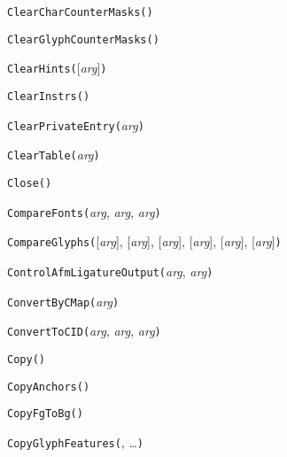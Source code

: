 \noindent\texttt{ClearCharCounterMasks(}\texttt{)}


\noindent\texttt{ClearGlyphCounterMasks(}\texttt{)}


\noindent\texttt{ClearHints(}[\textit{arg}]\texttt{)}


\noindent\texttt{ClearInstrs(}\texttt{)}


\noindent\texttt{ClearPrivateEntry(}\textit{arg}\texttt{)}


\noindent\texttt{ClearTable(}\textit{arg}\texttt{)}


\noindent\texttt{Close(}\texttt{)}


\noindent\texttt{CompareFonts(}\textit{arg}, \textit{arg}, \textit{arg}\texttt{)}


\noindent\texttt{CompareGlyphs(}[\textit{arg}], [\textit{arg}], [\textit{arg}], [\textit{arg}], [\textit{arg}], [\textit{arg}]\texttt{)}


\noindent\texttt{ControlAfmLigatureOutput(}\textit{arg}, \textit{arg}\texttt{)}


\noindent\texttt{ConvertByCMap(}\textit{arg}\texttt{)}


\noindent\texttt{ConvertToCID(}\textit{arg}, \textit{arg}, \textit{arg}\texttt{)}


\noindent\texttt{Copy(}\texttt{)}


\noindent\texttt{CopyAnchors(}\texttt{)}


\noindent\texttt{CopyFgToBg(}\texttt{)}


\noindent\texttt{CopyGlyphFeatures(}, \ldots\texttt{)}

